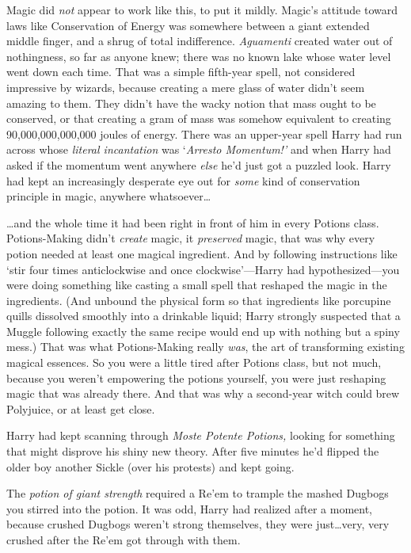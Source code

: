 Magic did \emph{not} appear to work like this, to put it mildly. Magic’s attitude toward laws like Conservation of Energy was somewhere between a giant extended middle finger, and a shrug of total indifference. \emph{Aguamenti} created water out of nothingness, so far as anyone knew; there was no known lake whose water level went down each time. That was a simple fifth-year spell, not considered impressive by wizards, because creating a mere glass of water didn’t seem amazing to them. They didn’t have the wacky notion that mass ought to be conserved, or that creating a gram of mass was somehow equivalent to creating 90,000,000,000,000 joules of energy. There was an upper-year spell Harry had run across whose \emph{literal incantation} was ‘\emph{Arresto Momentum!’} and when Harry had asked if the momentum went anywhere \emph{else} he’d just got a puzzled look. Harry had kept an increasingly desperate eye out for \emph{some} kind of conservation principle in magic, anywhere whatsoever…

…and the whole time it had been right in front of him in every Potions class. Potions-Making didn’t \emph{create} magic, it \emph{preserved} magic, that was why every potion needed at least one magical ingredient. And by following instructions like ‘stir four times anticlockwise and once clockwise’—Harry had hypothesized—you were doing something like casting a small spell that reshaped the magic in the ingredients. (And unbound the physical form so that ingredients like porcupine quills dissolved smoothly into a drinkable liquid; Harry strongly suspected that a Muggle following exactly the same recipe would end up with nothing but a spiny mess.) That was what Potions-Making really \emph{was}, the art of transforming existing magical essences. So you were a little tired after Potions class, but not much, because you weren’t empowering the potions yourself, you were just reshaping magic that was already there. And that was why a second-year witch could brew Polyjuice, or at least get close.

Harry had kept scanning through \emph{Moste Potente Potions,} looking for something that might disprove his shiny new theory. After five minutes he’d flipped the older boy another Sickle (over his protests) and kept going.

The \emph{potion of giant strength} required a Re’em to trample the mashed Dugbogs you stirred into the potion. It was odd, Harry had realized after a moment, because crushed Dugbogs weren’t strong themselves, they were just…very, very crushed after the Re’em got through with them.

